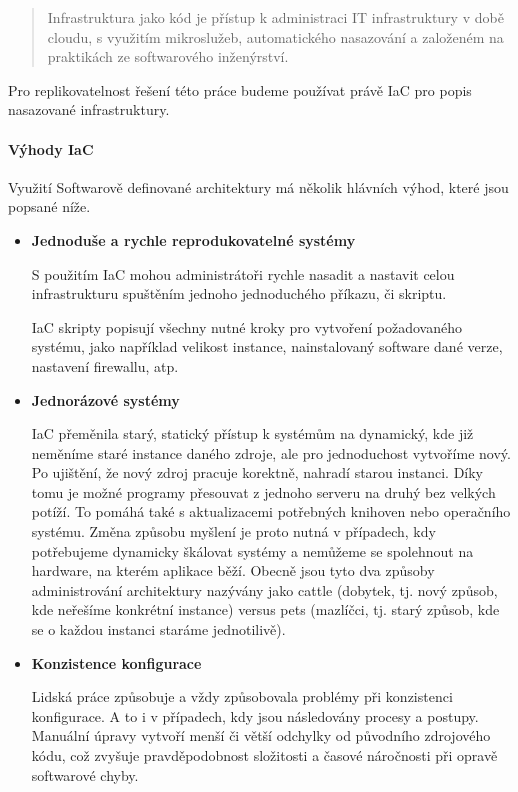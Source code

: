 \documentclass[thesis=M,czech]{FITthesis}[2019/12/23]
\theoremstyle{plain}
\theoremstyle{definition}
\begin{document}
\begin{quotation}
Infrastruktura jako kód je přístup k administraci IT infrastruktury v době cloudu, s využitím mikroslužeb, automatického nasazování a založeném na praktikách ze softwarového inženýrství.  
\end{quotation}

Pro replikovatelnost řešení této práce budeme používat právě IaC pro popis nasazované infrastruktury.

\paragraph{Výhody IaC}

Využití Softwarově definované architektury má několik hlávních výhod, které jsou popsané níže.


\begin{itemize}  

	\item \textbf{Jednoduše a rychle reprodukovatelné systémy}

	S použitím IaC mohou administrátoři rychle nasadit a nastavit celou infrastrukturu spuštěním jednoho jednoduchého příkazu, či skriptu.

	IaC skripty popisují všechny nutné kroky pro vytvoření požadovaného systému, jako například velikost instance, nainstalovaný software dané verze, nastavení firewallu, atp.

	\item \textbf{Jednorázové systémy} 

	IaC přeměnila starý, statický přístup k systémům na dynamický, kde již neměníme staré instance daného zdroje, ale pro jednoduchost vytvoříme nový. Po ujištění, že nový zdroj pracuje korektně, nahradí starou instanci. Díky tomu je možné programy přesouvat z jednoho serveru na druhý bez velkých potíží. To pomáhá také s aktualizacemi potřebných knihoven nebo operačního systému. Změna způsobu myšlení je proto nutná v případech, kdy potřebujeme dynamicky škálovat systémy a nemůžeme se spolehnout na hardware, na kterém aplikace běží. Obecně jsou tyto dva způsoby administrování architektury nazývány jako cattle (dobytek, tj. nový způsob, kde neřešíme konkrétní instance) versus pets (mazlíčci, tj. starý způsob, kde se o každou instanci staráme jednotilivě). \cite{cattle-pets}

	\item \textbf{Konzistence konfigurace} 

	Lidská práce způsobuje a vždy způsobovala problémy při konzistenci konfigurace. A to i v případech, kdy jsou následovány procesy a postupy. Manuální úpravy vytvoří menší či větší odchylky od původního zdrojového kódu, což zvyšuje pravděpodobnost složitosti a časové náročnosti při opravě softwarové chyby. 


\end{itemize}
\end{document}
